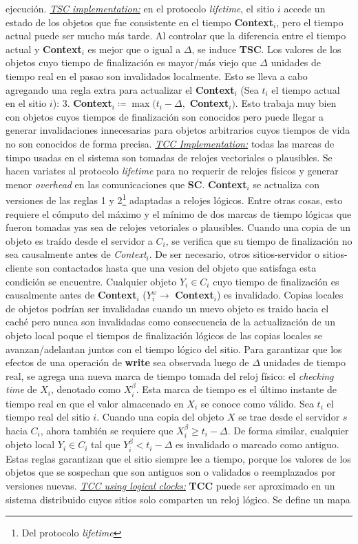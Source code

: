 ejecución. \underline{\emph{TSC implementation:}} en el protocolo \emph{lifetime}, el sitio $i$ accede un estado de los objetos que fue consistente en el tiempo \textbf{Context}$_i$, pero el tiempo actual puede ser mucho más tarde. Al controlar que la diferencia entre el tiempo actual y \textbf{Context}$_i$ es mejor que o igual a $\Delta$, se induce \textbf{TSC}. Los valores de los objetos cuyo tiempo de finalización es mayor/más viejo que $\Delta$ unidades de tiempo real en el pasao son invalidados localmente. Esto se lleva a cabo agregando una regla extra para actualizar el \textbf{Context}$_i$ (Sea $t_i$ el tiempo actual en el sitio $i$): 3. \textbf{Context}$_i \coloneqq \max(t_i - \Delta,$ \textbf{Context}$_i)$. Esto trabaja muy bien con objetos cuyos tiempos de finalización son conocidos pero puede llegar a generar invalidaciones innecesarias para objetos arbitrarios cuyos tiempos de vida no son conocidos de forma precisa. \underline{\emph{TCC Implementation:}} todas las marcas de timpo usadas en el sistema son tomadas de relojes vectoriales o plausibles. Se hacen variates al  protocolo \emph{lifetime} para no requerir de relojes físicos y generar menor \emph{overhead} en las comunicaciones que \textbf{SC}. \textbf{Context}$_i$ se actualiza con versiones de las reglas 1 y 2\footnote{Del protocolo \emph{lifetime}} adaptadas a relojes lógicos. Entre otras cosas, esto requiere el cómputo del máximo y el mínimo de dos marcas de tiempo lógicas que fueron tomadas yas sea de relojes vetoriales o plausibles. Cuando una copia de un objeto es traído desde el servidor a $C_i$, se verifica que su tiempo de finalización no sea causalmente antes de \textit{Context}$_i$. De ser necesario, otros sitios-servidor o sitios-cliente son contactados hasta que una vesion del objeto que satisfaga esta condición se encuentre. Cualquier objeto $Y_i \in C_i$ cuyo tiempo de finalización es causalmente antes de \textbf{Context}$_i$ ($Y_{i}^{\omega} \to $ \textbf{Context}$_i$) es invalidado. Copias locales de objetos podrían ser invalidadas cuando un nuevo objeto es traido hacia el caché pero nunca son invalidadas como consecuencia de la actualización de un objeto local poque el tiempos de finalización lógicos de las copias locales se avanzan/adelantan juntos con el tiempo lógico del sitio. Para garantizar que los efectos de una operación de \textbf{write} sea observada luego de $\Delta$ unidades de tiempo real, se agrega una nueva marca de tiempo tomada del reloj físico: el \emph{checking time} de $X_i$, denotado como $X_{i}^{\beta}$. Esta marca de tiempo es el último instante de tiempo real en que el valor almacenado en $X_i$ se conoce como válido. Sea $t_i$ el tiempo real del sitio $i$. Cuando una copia del objeto $X$ se trae desde el servidor $s$ hacia $C_i$, ahora también se requiere que $X_{i}^{\beta} \geq t_i - \Delta$. De forma similar, cualquier objeto local $Y_i \in C_i$ tal que $Y_{i}^{\beta} < t_i - \Delta$ es invalidado o marcado como antiguo. Estas reglas garantizan que el sitio siempre lee a tiempo, porque los valores de los objetos que se sospechan que son antiguos son o validados o reemplazados por versiones nuevas. \underline{\emph{TCC using logical clocks:}} \textbf{TCC} puede ser aproximado en un sistema distribuido cuyos sitios solo comparten un reloj lógico. Se define un mapa 